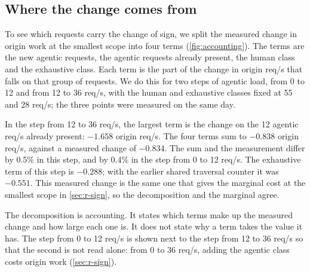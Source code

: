 \subsection{Where the change comes from}\label{sec:r-accounting}
To see which requests carry the change of sign, we split the measured change in origin
work at the smallest scope into four terms (\cref{fig:accounting}).
The terms are the new agentic requests, the agentic requests already present, the human
class and the exhaustive class.
Each term is the part of the change in origin req/s that falls on that group of
requests.
We do this for two steps of agentic load, from 0 to 12 and from 12 to 36 req/s, with the
human and exhaustive classes fixed at 55 and 28 req/s; the three points were measured on
the same day.

In the step from 12 to 36 req/s, the largest term is the change on the 12 agentic req/s
already present: $-1.658$ origin req/s.
The four terms sum to $-0.838$ origin req/s, against a measured change of
$-0.834$.
The sum and the measurement differ by 0.5\% in this step, and by 0.4\% in the step from
0 to 12 req/s.
The exhaustive term of this step is $-0.288$; with the earlier shared traversal counter it
was $-0.551$.
This measured change is the same one that gives the marginal cost at the smallest scope
in \cref{sec:r-sign}, so the decomposition and the marginal agree.

The decomposition is accounting.
It states which terms make up the measured change and how large each one is.
It does not state why a term takes the value it has.
The step from 0 to 12 req/s is shown next to the step from 12 to 36 req/s so that the
second is not read alone: from 0 to 36 req/s, adding the agentic class costs origin work
(\cref{sec:r-sign}).

